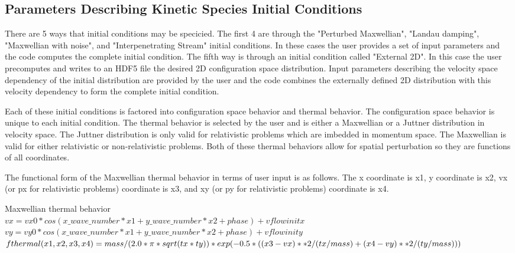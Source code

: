\documentclass[11pt]{amsart}
\begin{document}
\subsection*{Parameters Describing Kinetic Species Initial Conditions}
There are 5 ways that initial conditions may be specicied.  The first 4 are
through the "Perturbed Maxwellian", "Landau damping", "Maxwellian with noise",
and "Interpenetrating Stream" initial conditions.  In these cases the user
provides a set of input parameters and the code computes the complete initial
condition.  The fifth way is through an initial condition called "External 2D".
In this case the user precomputes and writes to an HDF5 file the desired 2D
configuration space distribution.  Input parameters describing the velocity
space dependency of the initial distribution are provided by the user and the
code combines the externally defined 2D distribution with this velocity
dependency to form the complete initial condition.

Each of these initial conditions is factored into configuration space behavior
and thermal behavior.  The configuration space behavior is unique to each
initial condition.  The thermal behavior is selected by the user and is either
a Maxwellian or a Juttner distribution in velocity space.  The Juttner
distribution is only valid for relativistic problems which are imbedded in
momentum space.  The Maxwellian is valid for either relativistic or
non-relativistic problems.  Both of these thermal behaviors allow for spatial
perturbation so they are functions of all coordinates.

The functional form of the Maxwellian thermal behavior in terms of user input is
as follows.  The x coordinate is x1, y coordinate is x2, vx (or px for
relativistic problems) coordinate is x3, and xy (or py for relativistic
problems) coordinate is x4.

Maxwellian thermal behavior \\
\begin{math}vx = vx0*cos(x\_wave\_number*x1+y\_wave\_number*x2+phase)+vflowinitx\end{math} \\
\begin{math}vy = vy0*cos(x\_wave\_number*x1+y\_wave\_number*x2+phase)+vflowinity\end{math} \\
\begin{math}fthermal(x1,x2,x3,x4) = mass/(2.0*\pi *sqrt(tx*ty))* \\
  exp(-0.5*((x3-vx)**2/(tx/mass)+(x4-vy)**2/(ty/mass)))\end{math}
\end{document}
